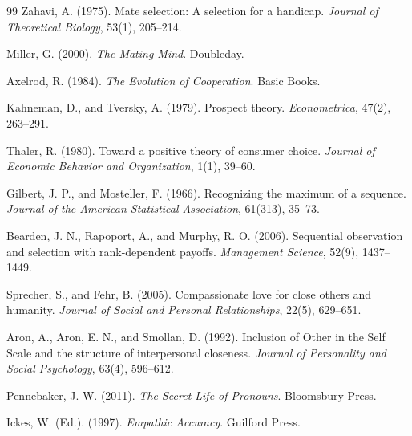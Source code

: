 \documentclass[11pt]{article}
\begin{document}
\begin{thebibliography}{99}
Zahavi, A. (1975).
\newblock Mate selection: A selection for a handicap.
\newblock \emph{Journal of Theoretical Biology}, 53(1), 205--214.

Miller, G. (2000).
\newblock \emph{The Mating Mind}.
\newblock Doubleday.

Axelrod, R. (1984).
\newblock \emph{The Evolution of Cooperation}.
\newblock Basic Books.

Kahneman, D., and Tversky, A. (1979).
\newblock Prospect theory.
\newblock \emph{Econometrica}, 47(2), 263--291.

Thaler, R. (1980).
\newblock Toward a positive theory of consumer choice.
\newblock \emph{Journal of Economic Behavior and Organization}, 1(1), 39--60.

Gilbert, J. P., and Mosteller, F. (1966).
\newblock Recognizing the maximum of a sequence.
\newblock \emph{Journal of the American Statistical Association}, 61(313), 35--73.

Bearden, J. N., Rapoport, A., and Murphy, R. O. (2006).
\newblock Sequential observation and selection with rank-dependent payoffs.
\newblock \emph{Management Science}, 52(9), 1437--1449.

Sprecher, S., and Fehr, B. (2005).
\newblock Compassionate love for close others and humanity.
\newblock \emph{Journal of Social and Personal Relationships}, 22(5), 629--651.

Aron, A., Aron, E. N., and Smollan, D. (1992).
\newblock Inclusion of Other in the Self Scale and the structure of interpersonal closeness.
\newblock \emph{Journal of Personality and Social Psychology}, 63(4), 596--612.

Pennebaker, J. W. (2011).
\newblock \emph{The Secret Life of Pronouns}.
\newblock Bloomsbury Press.

Ickes, W. (Ed.). (1997).
\newblock \emph{Empathic Accuracy}.
\newblock Guilford Press.

\end{thebibliography}
\end{document}
